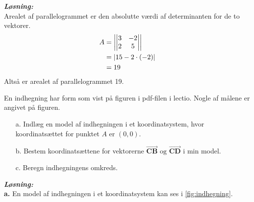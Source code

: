 \documentclass{article}
\newcommand{\sol}{\setlength{\parindent}{0cm}\textbf{\textit{Løsning:}}\setlength{\parindent}{1cm}}
\begin{document}
\sol \\
Arealet af parallelogrammet er den absolutte værdi af determinanten for de to vektorer.
\begin{equation*}
\begin{split}
  A&=\left| \mdet{3 & -2 \\ 2 & 5}  \right| \\ 
  &=\left| 15 -2 \cdot \left(-2\right) \right| \\ 
  &=19
\end{split}
\end{equation*}
Altså er arealet af parallelogrammet 19.
\begin{question}{}{}
  En indhegning har form som vist på figuren i pdf-filen i lectio.
  Nogle af målene er angivet på figuren.
  \begin{itemize}
    \item[a.] Indlæg en model af indhegningen i et koordinatsystem, hvor koordinatsættet for punktet $A$ er $(0,0)$. 
    \item[b.] Bestem koordinatsættene for vektorerne $\overrightarrow{\textbf{CB}} \text{ og } \overrightarrow{\textbf{CD}} $ i min model. 
    \item[c.] Beregn indhegningens omkreds.
  \end{itemize}
\end{question}
\sol \\
\textbf{a.} 
En model af indhegningen i et koordinatsystem kan ses i \cref{fig:indhegning}.
\end{document}
